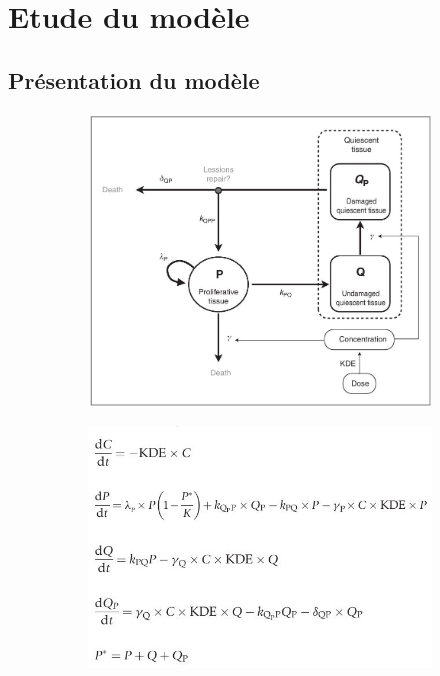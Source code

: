 \documentclass[12pt,a4paper]{article}
\begin{document}
\section{Etude du modèle}
\subsection{Présentation du modèle}
\begin{figure}
    \centering
    \begin{subfigure}[t]{0.45\textwidth}
        \centering
        \includegraphics[width=\linewidth]{Image/modele.JPG} 
        \caption{} \label{fig:model}
    \end{subfigure}
    \hfill
    \begin{subfigure}[t]{0.45\textwidth}
        \centering
        \includegraphics[width=\linewidth]{Image/eq.JPG} 
        \caption{} \label{fig:teq}
    \end{subfigure}


\end{figure}
\end{document}
